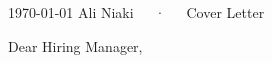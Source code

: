 \documentclass[11pt, a4paper]{awesome-cv}
\begin{document}
\makecvheader[R]

\makecvfooter
  {\today}
  {Ali Niaki~~~·~~~Cover Letter}
  {}

\makelettertitle

\begin{cvletter}

  \begin{letterbodyen}
    Dear Hiring Manager,
    




\end{letterbodyen}
\end{cvletter}
\end{document}
